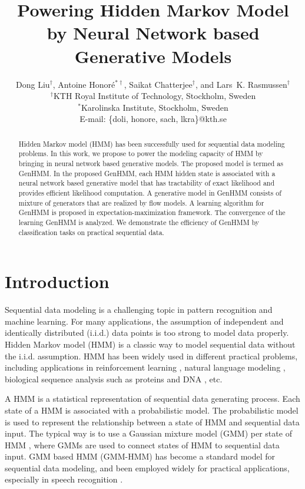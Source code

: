 \documentclass[letterpaper]{article} %
\title{Powering Hidden Markov Model by Neural Network based Generative Models}
\author{
  Dong Liu$^{\dagger}$, Antoine Honor\'e$^{\ast \dagger}$, Saikat Chatterjee$^{\dagger}$, and Lars~K. Rasmussen$^{\dagger}$\\
  $^{\dagger}$KTH Royal Institute of Technology, Stockholm, Sweden \\
  $^{\ast}$Karolinska Institute, Stockholm, Sweden \\
  E-mail: \{doli, honore, sach, lkra\}@kth.se}
\begin{document}
\maketitle
\begin{abstract}
Hidden Markov model (HMM) has been successfully used for sequential
data modeling problems.
In this work, we propose to power the modeling capacity of HMM by
bringing in neural network based generative models.
The proposed model is termed as GenHMM.
In the proposed GenHMM, each HMM hidden state is associated with a
neural network based generative model that has
tractability of exact likelihood and provides efficient likelihood
computation.
A generative model in GenHMM consists of mixture of generators
that are realized by flow models.
A learning algorithm for GenHMM is proposed in
expectation-maximization framework.
The convergence of the learning GenHMM is analyzed.
We demonstrate the efficiency of GenHMM by classification tasks on practical sequential data.
\end{abstract}

\section{Introduction}
Sequential data modeling is a challenging topic in pattern recognition and machine learning. For many applications, the assumption of independent and identically distributed (i.i.d.) data points is too strong to model data properly. Hidden Markov model (HMM) is a classic way to model sequential data without the i.i.d. assumption. HMM has been widely used in different practical problems, including applications in reinforcement learning \cite{ding2018reinforcementhmm,levine2018reinforcementReview}, natural language modeling \cite{khan2016survey,Hariyanti_2019}, biological sequence analysis such as proteins \cite{ASHWIN20172} and DNA \cite{ren2015dna}, etc.

A HMM is a statistical representation of sequential data generating process.
Each state of a HMM is associated with a probabilistic model.
The probabilistic model is used to represent the relationship between a state of HMM and sequential data input. The typical way is to use a Gaussian mixture model (GMM) per state of HMM \cite{juang1986maximum}, where GMMs are used to connect states of HMM to sequential data input. GMM based HMM (GMM-HMM) has become a standard model for sequential data modeling, and been employed widely for practical applications, especially in speech recognition \cite{gales2008application,chatterjee2011auditory}.
\end{document}
